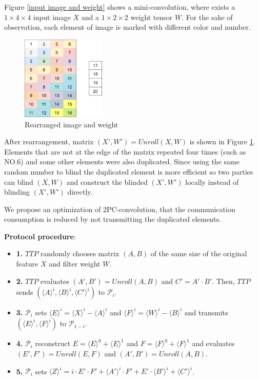 \documentclass[letterpaper]{article} %
\begin{document}
    Figure \ref{input image and weight} shows a mini-convolution,
    where exists a $1\times 4\times 4$ input image $X$  and a $1\times 2\times 2$ weight tensor $W$.
    For the sake of observation, each element of image is marked with different color and number.

    \begin{figure}[htbp]
        \centering
        \includegraphics[width=4cm]{new_unrolling2.png}
        \caption{Rearranged image and weight}
        \label{rearrangement of image and weight}
    \end{figure}

    After rearrangement, matrix $(X',W')=Unroll(X,W)$
    is shown in Figure \ref{rearrangement of image and weight}.
    Elements that are not at the edge of the matrix repeated four times (such as NO.6)
    and some other elements were also duplicated.
    Since using the same random number to blind the duplicated element
    is more efficient so two parties can blind $(X,W)$ and
    construct the blinded $(X',W')$ locally instead of blinding $(X',W')$ directly.


    We propose an optimization of 2PC-convolution,
    that the communication consumption is reduced by
    not transmitting the duplicated elements.

    \textbf{Protocol procedure}:
    \begin{itemize}
        \item \textbf{1.} $TTP$ randomly chooses matrix $(A,B)$ of the same size of the original feature $X$ and filter weight $W$.
        \item \textbf{2.} $TTP$ evaluates $( A',B')=Unroll(A,B)$ and $C' =A'\cdot B' $.
        Then, $TTP$ sends $(\langle A\rangle ^{i},\langle B\rangle ^{i},\langle C'\rangle ^{i})$ to $\mathcal{P}_{i}$.
        \item \textbf{3.} $\mathcal{P}_{i}$ sets $\langle E\rangle ^{i}=\langle X\rangle ^{i}-\langle A\rangle ^{i}$
        and $\langle F\rangle ^{i}=\langle W\rangle ^{i}-\langle B\rangle ^{i}$
        and transmits $(\langle E\rangle ^{i},\langle F\rangle ^{i})$ to $\mathcal{P}_{1-i}$.
        \item \textbf{4.} $\mathcal{P}_{i}$ reconstruct $E = \langle E\rangle ^{0}+\langle E\rangle ^{1}$ and $F = \langle F\rangle ^{0}+\langle F\rangle ^{1}$
        and evaluates $(E',F')=Unroll(E,F)$ and $(A',B')=Unroll(A,B)$.
        \item \textbf{5.} $\mathcal{P}_{i}$ sets $\langle Z\rangle^{i}=i\cdot E' \cdot F' + \langle A'\rangle^{i} \cdot F' + E' \cdot \langle B'\rangle^{i} + \langle C'\rangle^{i}$.

    \end{itemize}
\end{document}
